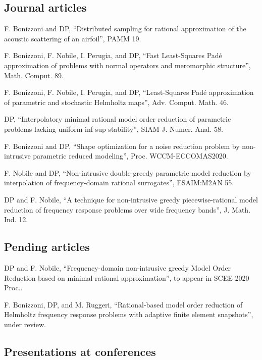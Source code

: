 \documentclass[11pt]{article} %
\begin{document}
\subsection*{Journal articles}

\hspace{\parindent}F. Bonizzoni and DP, ``Distributed sampling for rational approximation of the acoustic scattering of an airfoil'', PAMM 19.

F. Bonizzoni, F. Nobile, I. Perugia, and DP, ``Fast Least-Squares Pad\'e approximation of problems with normal operators and meromorphic structure'', Math. Comput. 89.

F. Bonizzoni, F. Nobile, I. Perugia, and DP, ``Least-Squares Pad\'e approximation of parametric and stochastic Helmholtz maps'', Adv. Comput. Math. 46.

\yearsminus DP, ``Interpolatory minimal rational model order reduction of parametric problems lacking uniform inf-sup stability'', SIAM J. Numer. Anal. 58.

F. Bonizzoni and DP, ``Shape optimization for a noise reduction problem by non-intrusive parametric reduced modeling'', Proc. WCCM-ECCOMAS2020.

\yearsminus F. Nobile and DP, ``Non-intrusive double-greedy parametric model reduction by interpolation of frequency-domain rational surrogates'', ESAIM:M2AN 55.

DP and F. Nobile, ``A technique for non-intrusive greedy piecewise-rational model reduction of frequency response problems over wide frequency bands'', J. Math. Ind. 12.

\subsection*{Pending articles}

\hspace{\parindent}DP and F. Nobile, ``Frequency-domain non-intrusive greedy Model Order Reduction based on minimal rational approximation'', to appear in SCEE 2020 Proc..

F. Bonizzoni, DP, and M. Ruggeri, ``Rational-based model order reduction of Helmholtz frequency response problems with adaptive finite element snapshots'', under review.

\subsection*{Presentations at conferences}
\end{document}
